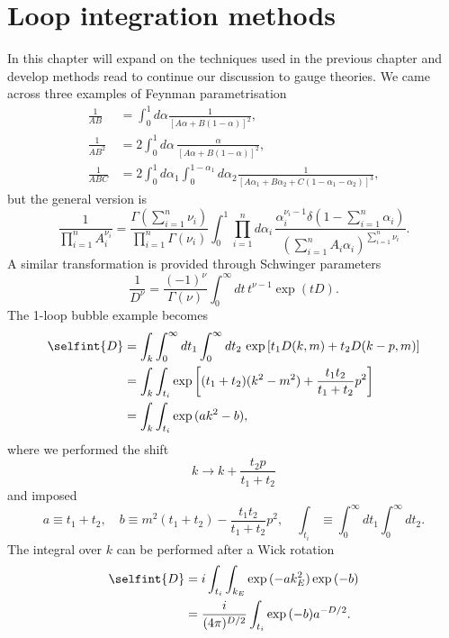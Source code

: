 \chapter{Loop integration methods}
In this chapter will expand on the techniques used in the previous chapter and develop methods read to continue our discussion to gauge theories. We came across three examples of Feynman parametrisation
\begin{align}
    \frac{1}{AB} &= \int_0^1 d\alpha\frac{1}{[A\alpha + B(1 - \alpha)]^2}, \\
    \frac{1}{AB^2} &= 2\int_0^1 d\alpha\,\frac{\alpha}{[A\alpha + B(1 - \alpha)]^2}, \\
    \frac{1}{ABC} &= 2\int_0^1 d\alpha_1\int_0^{1 - \alpha_1}d\alpha_2\frac{1}{[A\alpha_1 + B\alpha_2 + C(1 - \alpha_1 - \alpha_2)]^3},
\end{align}
but the general version is
\begin{equation}
    \frac{1}{\prod_{i=1}^nA_i^{\nu_i}} = \frac{\Gamma(\sum_{i=1}^n\nu_i)}{\prod_{i=1}^n\Gamma(\nu_i)}\int_0^1\prod_{i=1}^nd\alpha_i\,\frac{\alpha_i^{\nu_i - 1}\delta(1 - \sum_{i=1}^n\alpha_i)}{(\sum_{i=1}^nA_i\alpha_i)^{\sum_{i=1}^n\nu_i}}.
\end{equation}
A similar transformation is provided through Schwinger parameters
\begin{equation}
    \frac{1}{D^\nu} = \frac{(-1)^\nu}{\Gamma(\nu)}\int_0^\infty dt\,t^{\nu - 1}\exp{(tD)}.
\end{equation}
The 1-loop bubble example becomes
\begin{equation}
    \begin{split}
        \selfint{D} &= \int_k\int_0^\infty dt_1\int_0^\infty dt_2\,\exp{[t_1D(k,m) + t_2D(k - p,m)]} \\
        &= \int_k\int_{t_i}\exp{\bigg[(t_1 + t_2)(k^2 - m^2) + \frac{t_1t_2}{t_1 + t_2}p^2\bigg]} \\
        &= \int_k\int_{t_i}\exp{(ak^2 - b)},
    \end{split} 
\end{equation}
where we performed the shift 
\begin{equation}
\label{eq: loop momentum shift}
    k \to k + \frac{t_2p}{t_1 + t_2}
\end{equation}
and imposed
\begin{equation}
    a \equiv t_1 + t_2,\quad b \equiv m^2(t_1 + t_2) - \frac{t_1t_2}{t_1 + t_2}p^2,\quad \int_{t_i} \equiv \int_0^\infty dt_1\int_0^\infty dt_2.
\end{equation}
The integral over $k$ can be performed after a Wick rotation 
\begin{equation}
    \begin{split}
        \selfint{D} &= i\int_{t_i}\int_{k_E}\exp{(-ak_E^2)}\exp{(-b)} \\
        &= \frac{i}{(4\pi)^{D/2}}\int_{t_i}\exp{(-b)}a^{-D/2}.
    \end{split}
\end{equation}

